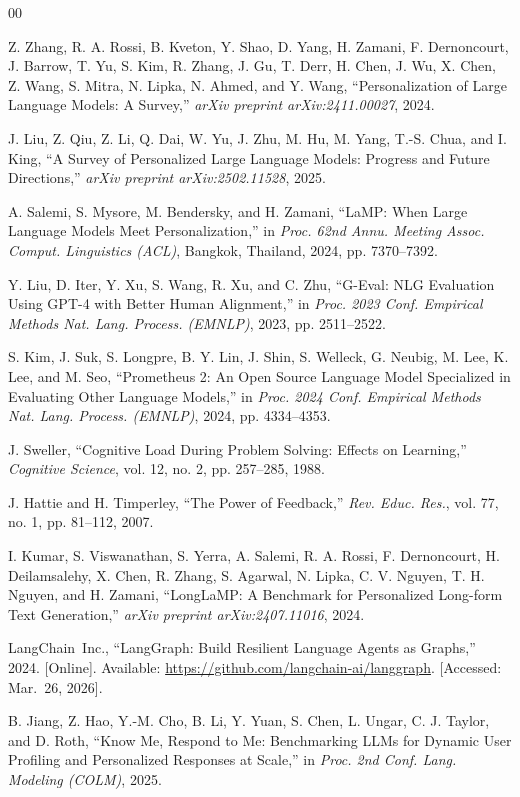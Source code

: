 \documentclass[conference]{IEEEtran}
\begin{document}
\begin{thebibliography}{00}

Z. Zhang, R. A. Rossi, B. Kveton, Y. Shao, D. Yang, H. Zamani, F. Dernoncourt, J. Barrow, T. Yu, S. Kim, R. Zhang, J. Gu, T. Derr, H. Chen, J. Wu, X. Chen, Z. Wang, S. Mitra, N. Lipka, N. Ahmed, and Y. Wang, ``Personalization of Large Language Models: A Survey,'' \textit{arXiv preprint arXiv:2411.00027}, 2024.

J. Liu, Z. Qiu, Z. Li, Q. Dai, W. Yu, J. Zhu, M. Hu, M. Yang, T.-S. Chua, and I. King, ``A Survey of Personalized Large Language Models: Progress and Future Directions,'' \textit{arXiv preprint arXiv:2502.11528}, 2025.

A. Salemi, S. Mysore, M. Bendersky, and H. Zamani, ``LaMP: When Large Language Models Meet Personalization,'' in \textit{Proc. 62nd Annu. Meeting Assoc. Comput. Linguistics (ACL)}, Bangkok, Thailand, 2024, pp. 7370--7392.

Y. Liu, D. Iter, Y. Xu, S. Wang, R. Xu, and C. Zhu, ``G-Eval: NLG Evaluation Using GPT-4 with Better Human Alignment,'' in \textit{Proc. 2023 Conf. Empirical Methods Nat. Lang. Process. (EMNLP)}, 2023, pp. 2511--2522.

S. Kim, J. Suk, S. Longpre, B. Y. Lin, J. Shin, S. Welleck, G. Neubig, M. Lee, K. Lee, and M. Seo, ``Prometheus 2: An Open Source Language Model Specialized in Evaluating Other Language Models,'' in \textit{Proc. 2024 Conf. Empirical Methods Nat. Lang. Process. (EMNLP)}, 2024, pp. 4334--4353.

J. Sweller, ``Cognitive Load During Problem Solving: Effects on Learning,'' \textit{Cognitive Science}, vol. 12, no. 2, pp. 257--285, 1988.

J. Hattie and H. Timperley, ``The Power of Feedback,'' \textit{Rev. Educ. Res.}, vol. 77, no. 1, pp. 81--112, 2007.

I. Kumar, S. Viswanathan, S. Yerra, A. Salemi, R. A. Rossi, F. Dernoncourt, H. Deilamsalehy, X. Chen, R. Zhang, S. Agarwal, N. Lipka, C. V. Nguyen, T. H. Nguyen, and H. Zamani, ``LongLaMP: A Benchmark for Personalized Long-form Text Generation,'' \textit{arXiv preprint arXiv:2407.11016}, 2024.

LangChain~Inc., ``LangGraph: Build Resilient Language Agents as Graphs,'' 2024. [Online]. Available: \url{https://github.com/langchain-ai/langgraph}. [Accessed: Mar.~26, 2026].

B. Jiang, Z. Hao, Y.-M. Cho, B. Li, Y. Yuan, S. Chen, L. Ungar, C. J. Taylor, and D. Roth, ``Know Me, Respond to Me: Benchmarking LLMs for Dynamic User Profiling and Personalized Responses at Scale,'' in \textit{Proc. 2nd Conf. Lang. Modeling (COLM)}, 2025.


\end{thebibliography}
\end{document}
